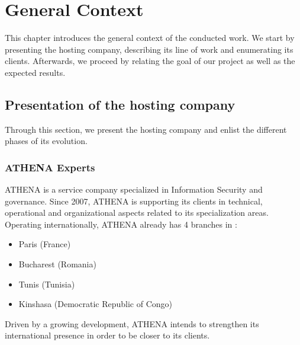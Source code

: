 
\chapter{General Context}
\renewcommand{\chaptername}{Chapter}
This chapter introduces the general context of the conducted work. 
We start by presenting the hosting company, describing its line of work and enumerating its clients. Afterwards, we proceed by relating the goal of our project as well as the expected results.

\section {Presentation of the hosting company}

Through this section, we present the hosting company and enlist the different phases of its evolution.

\subsection{ATHENA Experts}

ATHENA is a service company specialized in Information Security and governance. Since 2007, ATHENA is supporting its clients in technical, operational and organizational aspects related to its specialization areas. Operating internationally, ATHENA already has 4 branches in :
\begin{itemize}
\item Paris (France)
\item Bucharest (Romania)
\item Tunis (Tunisia)
\item Kinshasa (Democratic Republic of Congo)
\end{itemize}
Driven by a growing development, ATHENA intends to strengthen its international presence in order to be closer to its clients.



